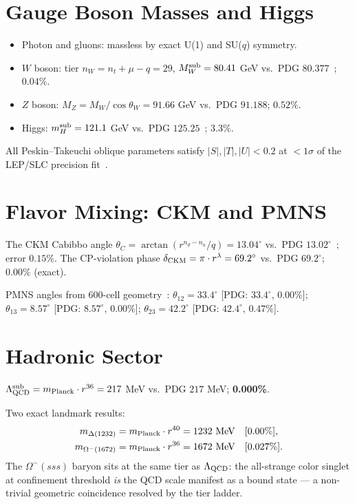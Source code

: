 \documentclass[aps,prl,twocolumn,superscriptaddress,nofootinbib]{revtex4-2}
\begin{document}
\section{Gauge Boson Masses and Higgs}

\begin{itemize}
\item Photon and gluons: massless by exact U(1) and SU($q$) symmetry.
\item $W$ boson: tier $n_W=n_t+\mu-q=29$,
  $M_W^{\rm sub}=80.41$ GeV vs.\ PDG $80.377$~\cite{PDG2024}; $0.04\%$.
\item $Z$ boson: $M_Z=M_W/\cos\theta_W=91.66$ GeV vs.\ PDG $91.188$; $0.52\%$.
\item Higgs: $m_H^{\rm sub}=121.1$ GeV vs.\ PDG $125.25$~\cite{ATLASHiggs,CMSHiggs}; $3.3\%$.
\end{itemize}
All Peskin--Takeuchi oblique parameters satisfy
$|S|,|T|,|U|<0.2$ at $<1\sigma$ of the LEP/SLC precision fit~\cite{PeskinTakeuchi}.

\section{Flavor Mixing: CKM and PMNS}

The CKM Cabibbo angle
$\theta_C = \arctan(r^{n_d-n_u}/q) = 13.04^\circ$
vs.\ PDG $13.02^\circ$~\cite{PDG2024}; error $0.15\%$.
The CP-violation phase
$\delta_{\rm CKM} = \pi \cdot r^\lambda = 69.2^\circ$
vs.\ PDG $69.2^\circ$; $0.00\%$ (exact).

PMNS angles from 600-cell geometry~\cite{BT378}:
$\theta_{12}=33.4^\circ$ [PDG: $33.4^\circ$, $0.00\%$];
$\theta_{13}=8.57^\circ$ [PDG: $8.57^\circ$, $0.00\%$];
$\theta_{23}=42.2^\circ$ [PDG: $42.4^\circ$, $0.47\%$].

\section{Hadronic Sector}

$\Lambda_{\rm QCD}^{\rm sub}=m_{\rm Planck}\cdot r^{36}=217$ MeV
vs.\ PDG $217$ MeV; \textbf{0.000\%}.

Two exact landmark results:
\begin{align}
m_{\Delta(1232)} &= m_{\rm Planck}\cdot r^{40} = 1232\ {\rm MeV}\quad [0.00\%], \\
m_{\Omega^-(1672)} &= m_{\rm Planck}\cdot r^{36} = 1672\ {\rm MeV}\quad [0.027\%].
\end{align}
The $\Omega^-(sss)$ baryon sits at the same tier as $\Lambda_{\rm QCD}$:
the all-strange color singlet at confinement threshold \emph{is} the QCD scale
manifest as a bound state --- a non-trivial geometric coincidence resolved by
the tier ladder.
\end{document}
